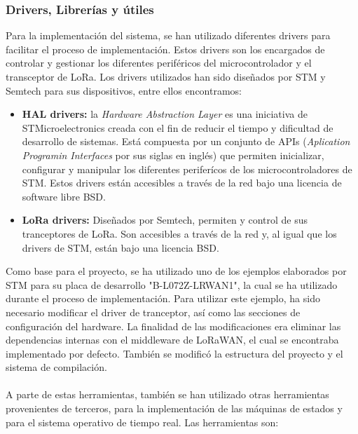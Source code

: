 		\subsubsection{Drivers, Librerías y útiles}
			Para la implementación del sistema, se han utilizado diferentes drivers para facilitar el proceso de implementación. Estos drivers son los encargados de controlar y gestionar los diferentes periféricos del microcontrolador y el transceptor de LoRa. Los drivers utilizados han sido diseñados por STM y Semtech para sus dispositivos, entre ellos encontramos:
			
			\begin{itemize}
				\item \textbf{HAL drivers:}  la \textit{Hardware Abstraction Layer} es una iniciativa de STMicroelectronics creada con el fin de reducir el tiempo y dificultad de desarrollo de sistemas. Está compuesta por un conjunto de APIs (\textit{Aplication Programin Interfaces} por sus siglas en inglés) que permiten inicializar, configurar y manipular los diferentes periferícos de los microcontroladores de STM. Estos drivers están accesibles a  través de la red bajo una licencia de software libre BSD.
				
				\item \textbf{LoRa drivers:} Diseñados por Semtech, permiten y control de sus tranceptores de LoRa. Son accesibles a través de la red y, al igual que los drivers de STM, están bajo una licencia BSD.
			\end{itemize}			 
			
			Como base para el proyecto, se ha utilizado uno de los ejemplos elaborados por STM para su placa de desarrollo "B-L072Z-LRWAN1", la cual se ha utilizado durante el proceso de implementación. Para utilizar este ejemplo, ha sido necesario modificar el driver de tranceptor, así como las secciones de configuración del hardware. La finalidad de las modificaciones era eliminar las dependencias internas con el middleware de LoRaWAN, el cual se encontraba implementado por defecto. También se modificó la estructura del proyecto y el sistema de compilación.
			\paragraph{}
			
			A parte de estas herramientas, también se han utilizado otras herramientas provenientes de terceros, para la implementación de las máquinas de estados y para el sistema operativo de tiempo real. Las herramientas son:
			
